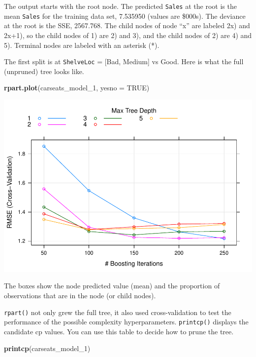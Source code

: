 \documentclass[
]{book}
\newenvironment{Shaded}{\begin{snugshade}}{\end{snugshade}}
\newcommand{\DataTypeTok}[1]{\textcolor[rgb]{0.13,0.29,0.53}{#1}}
\newcommand{\DecValTok}[1]{\textcolor[rgb]{0.00,0.00,0.81}{#1}}
\newcommand{\KeywordTok}[1]{\textcolor[rgb]{0.13,0.29,0.53}{\textbf{#1}}}
\newcommand{\NormalTok}[1]{#1}
\newcommand{\OtherTok}[1]{\textcolor[rgb]{0.56,0.35,0.01}{#1}}
\begin{document}
The output starts with the root node. The predicted \texttt{Sales} at the root is the mean \texttt{Sales} for the training data set, 7.535950 (values are \$000s). The deviance at the root is the SSE, 2567.768. The child nodes of node ``x'' are labeled 2x) and 2x+1), so the child nodes of 1) are 2) and 3), and the child nodes of 2) are 4) and 5). Terminal nodes are labeled with an asterisk (*).

The first split is at \texttt{ShelveLoc} = {[}Bad, Medium{]} vs Good. Here is what the full (unpruned) tree looks like.

\begin{Shaded}
\begin{Highlighting}[]
\KeywordTok{rpart.plot}\NormalTok{(carseats_model_}\DecValTok{1}\NormalTok{, }\DataTypeTok{yesno =} \OtherTok{TRUE}\NormalTok{)}
\end{Highlighting}
\end{Shaded}

\includegraphics{data-sci_files/figure-latex/unnamed-chunk-87-1.pdf}

The boxes show the node predicted value (mean) and the proportion of observations that are in the node (or child nodes).

\texttt{rpart()} not only grew the full tree, it also used cross-validation to test the performance of the possible complexity hyperparameters. \texttt{printcp()} displays the candidate cp values. You can use this table to decide how to prune the tree.

\begin{Shaded}
\begin{Highlighting}[]
\KeywordTok{printcp}\NormalTok{(carseats_model_}\DecValTok{1}\NormalTok{)}
\end{Highlighting}
\end{Shaded}
\end{document}
